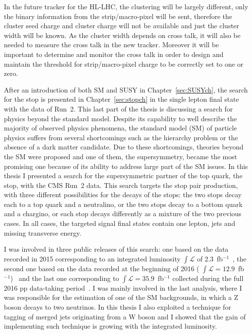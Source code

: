 In the future tracker for the HL-LHC, the clustering will be largely different, only the binary information from the strip/macro-pixel will be sent, therefore the cluster seed charge and cluster charge will not be available and just the cluster width will be known. As the cluster width depends on cross talk, it will also be needed to measure the cross talk in the new tracker. Moreover it will be important to determine and monitor the cross talk in order to design and maintain the threshold for strip/macro-pixel charge to be correctly set to one or zero.



\vspace*{1cm}

After an introduction of both SM and SUSY in Chapter~\ref{sec:SUSYch}, the search for the stop is presented in Chapter~\ref{sec:stopch} in the single lepton final state with the data of Run~2. This last part of the thesis is discussing a search for physics beyond the standard model. Despite its capability to well describe the majority of observed physics phenomena, the standard model (SM) of particle physics suffers from several shortcomings such as the hierarchy problem or the absence of a dark matter candidate. Due to these shortcomings, theories beyond the SM were proposed and one of them, the supersymmetry, became the most promising one because of its ability to address large part of the SM issues. In this thesis I presented a search for the supersymmetric partner of the top quark, the stop, with the CMS Run~2 data. This search targets the stop pair production, with three different possibilities for the decays of the stops: the two stops decay each to a top quark and a neutralino, or the two stops decay to a bottom quark and a chargino, or each stop decays differently as a mixture of the two previous cases. In all cases, the targeted signal final states contain one lepton, jets and missing transverse energy. 

I was involved in three public releases of this search: one based on the data recorded in 2015 corresponding to an integrated luminosity $\int{\mathcal{L}}$ of 2.3~fb$^{-1}$~\cite{Sirunyan:2016jpr}, the second one based on the data recorded at the beginning of 2016 ( $\int{\mathcal{L}}=12.9$~fb$^{-1}$)~\cite{CMS:2016vew} and the last one corresponding to $\int{\mathcal{L}}= 35.9$~fb$^{-1}$ collected during the full 2016 pp data-taking period~\cite{Sirunyan:2017xse}. I was mainly involved in the last analysis, where I was responsible for the estimation of one of the SM backgrounds, in which a Z boson decays to two neutrinos. In this thesis I also exploited a technique for tagging of merged jets originating from a W boson and I showed that the gain of implementing such technique is growing with the integrated luminosity. 

